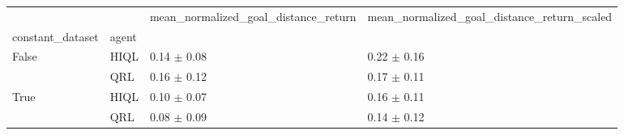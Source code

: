 \begin{tabular}{llll}
\toprule
 &  & mean_normalized_goal_distance_return & mean_normalized_goal_distance_return_scaled \\
constant_dataset & agent &  &  \\
\midrule
\multirow[t]{2}{*}{False} & HIQL & 0.14 $\pm$ 0.08 & 0.22 $\pm$ 0.16 \\
 & QRL & 0.16 $\pm$ 0.12 & 0.17 $\pm$ 0.11 \\
\cline{1-4}
\multirow[t]{2}{*}{True} & HIQL & 0.10 $\pm$ 0.07 & 0.16 $\pm$ 0.11 \\
 & QRL & 0.08 $\pm$ 0.09 & 0.14 $\pm$ 0.12 \\
\cline{1-4}
\bottomrule
\end{tabular}
